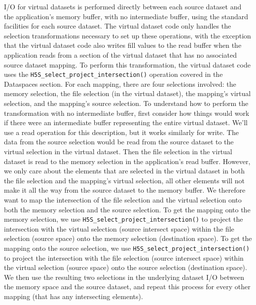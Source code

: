 \begin{itemize}
I/O for virtual datasets is performed directly between each source dataset and the application's memory buffer, with no intermediate buffer, using the standard facilities for each source dataset. The virtual dataset code only handles the selection transformations necessary to set up these operations, with the exception that the virtual dataset code also writes fill values to the read buffer when the application reads from a section of the virtual dataset that has no associated source dataset mapping. To perform this transformation, the virtual dataset code uses the \texttt{H5S\_select\_project\_intersection()} operation covered in the Dataspaces section. For each mapping, there are four selections involved: the memory selection, the file selection (in the virtual dataset), the mapping's virtual selection, and the mapping's source selection. To understand how to perform the transformation with no intermediate buffer, first consider how things would work if there were an intermediate buffer representing the entire virtual dataset. We'll use a read operation for this description, but it works similarly for write. The data from the source selection would be read from the source dataset to the virtual selection in the virtual dataset. Then the file selection in the virtual dataset is read to the memory selection in the application's read buffer. However, we only care about the elements that are selected in the virtual dataset in both the file selection and the mapping's virtual selection, all other elements will not make it all the way from the source dataset to the memory buffer. We therefore want to map the intersection of the file selection and the virtual selection onto both the memory selection and the source selection. To get the mapping onto the memory selection, we use \texttt{H5S\_select\_project\_intersection()} to project the intersection with the virtual selection (source intersect space) within the file selection (source space) onto the memory selection (destination space). To get the mapping onto the source selection, we use \texttt{H5S\_select\_project\_intersection()} to project the intersection with the file selection (source intersect space) within the virtual selection (source space) onto the source selection (destination space). We then use the resulting two selections in the underlying dataset I/O between the memory space and the source dataset, and repeat this process for every other mapping (that has any intersecting elements).


\end{itemize}
